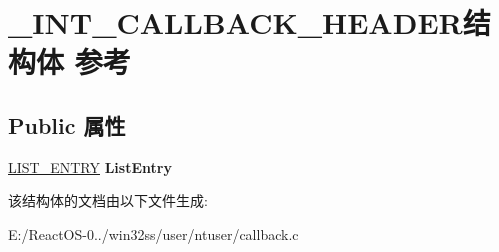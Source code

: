 \hypertarget{struct___i_n_t___c_a_l_l_b_a_c_k___h_e_a_d_e_r}{}\section{\+\_\+\+I\+N\+T\+\_\+\+C\+A\+L\+L\+B\+A\+C\+K\+\_\+\+H\+E\+A\+D\+E\+R结构体 参考}
\label{struct___i_n_t___c_a_l_l_b_a_c_k___h_e_a_d_e_r}
\subsection*{Public 属性}
\begin{DoxyCompactItemize}
\item 
\mbox{\label{struct___i_n_t___c_a_l_l_b_a_c_k___h_e_a_d_e_r_a2f090f80232a829bf4c9867cbec36126}} 
\hyperlink{struct___l_i_s_t___e_n_t_r_y}{L\+I\+S\+T\+\_\+\+E\+N\+T\+RY} {\bfseries List\+Entry}
\end{DoxyCompactItemize}


该结构体的文档由以下文件生成\+:\begin{DoxyCompactItemize}
\item 
E\+:/\+React\+O\+S-\/0../win32ss/user/ntuser/callback.\+c\end{DoxyCompactItemize}
